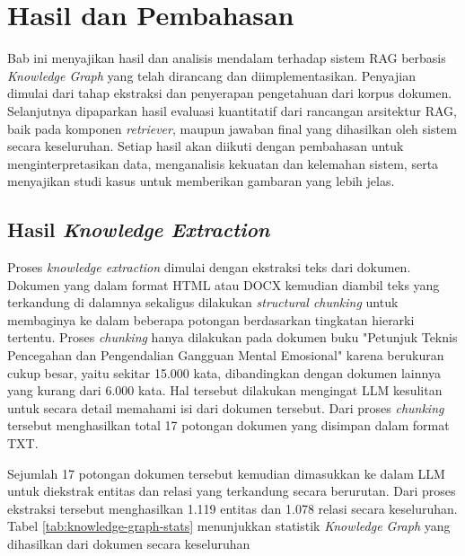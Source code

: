 \chapter{Hasil dan Pembahasan}

Bab ini menyajikan hasil dan analisis mendalam terhadap sistem RAG berbasis \textit{Knowledge Graph} yang telah dirancang dan diimplementasikan.
Penyajian dimulai dari tahap ekstraksi dan penyerapan pengetahuan dari korpus dokumen.
Selanjutnya dipaparkan hasil evaluasi kuantitatif dari rancangan arsitektur RAG, baik pada komponen \textit{retriever}, maupun jawaban final yang dihasilkan oleh sistem secara keseluruhan.
Setiap hasil akan diikuti dengan pembahasan untuk menginterpretasikan data, menganalisis kekuatan dan kelemahan sistem, serta menyajikan studi kasus untuk memberikan gambaran yang lebih jelas.

\section{Hasil \textit{Knowledge Extraction}}
Proses \textit{knowledge extraction} dimulai dengan ekstraksi teks dari dokumen.
Dokumen yang dalam format HTML atau DOCX kemudian diambil teks yang terkandung di dalamnya sekaligus dilakukan \textit{structural chunking} untuk membaginya ke dalam beberapa potongan berdasarkan tingkatan hierarki tertentu.
Proses \textit{chunking} hanya dilakukan pada dokumen buku "Petunjuk Teknis Pencegahan dan Pengendalian Gangguan Mental Emosional" karena berukuran cukup besar, yaitu sekitar 15.000 kata, dibandingkan dengan dokumen lainnya yang kurang dari 6.000 kata.
Hal tersebut dilakukan mengingat LLM kesulitan untuk secara detail memahami isi dari dokumen tersebut.
Dari proses \textit{chunking} tersebut menghasilkan total 17 potongan dokumen yang disimpan dalam format TXT.

Sejumlah 17 potongan dokumen tersebut kemudian dimasukkan ke dalam LLM untuk diekstrak entitas dan relasi yang terkandung secara berurutan.
Dari proses ekstraksi tersebut menghasilkan 1.119 entitas dan 1.078 relasi secara keseluruhan.
Tabel \ref{tab:knowledge-graph-stats} menunjukkan statistik \textit{Knowledge Graph} yang dihasilkan dari dokumen secara keseluruhan

